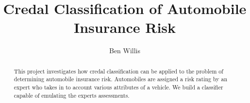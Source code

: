 \documentclass[11pt]{report}
\begin{document}
\title{Credal Classification of Automobile Insurance Risk}
\author{Ben Willis}
\maketitle

\begin{abstract}
	This project investigates how credal classification can be applied to the problem of determining automobile insurance risk. Automobiles are assigned a risk rating by an expert who takes in to account various attributes of a vehicle. We build a classifier capable of emulating the experts assessments.
\end{abstract}

\tableofcontents










\end{document}
